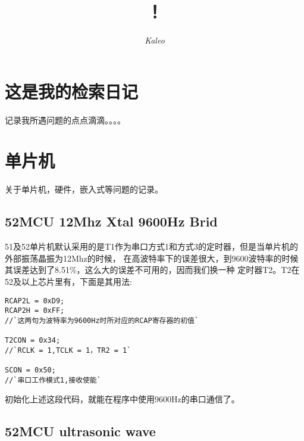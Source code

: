 \documentclass{book}
\begin{document}
\begin{CJK}{UTF8}{gbsn}


\title{\Huge{}！}
\author{\it Kaleo}
\date{}
\maketitle


\renewcommand{\contentsname}{Keywords Index}
\tableofcontents


\chapter*{这是我的检索日记}
记录我所遇问题的点点滴滴。。。。
\newpage


\chapter*{单片机}
关于单片机，硬件，嵌入式等问题的记录。
\newpage


\section{52MCU 12Mhz Xtal 9600Hz Brid }

51及52单片机默认采用的是T1作为串口方式1和方式3的定时器，但是当单片机的外部振荡晶振为12Mhz的时候，
在高波特率下的误差很大，到9600波特率的时候其误差达到了8.51\%，这么大的误差不可用的，因而我们换一种
定时器T2。T2在52及以上芯片里有，下面是其用法:
\begin{lstlisting}
RCAP2L = 0xD9;
RCAP2H = 0xFF;
//`这两句为波特率为9600Hz时所对应的RCAP寄存器的初值`

T2CON = 0x34;
//`RCLK = 1,TCLK = 1，TR2 = 1`

SCON = 0x50;
//`串口工作模式1,接收使能`
\end{lstlisting}
初始化上述这段代码，就能在程序中使用9600Hz的串口通信了。
\newpage


\section{52MCU ultrasonic wave}


\end{CJK}
\end{document}
